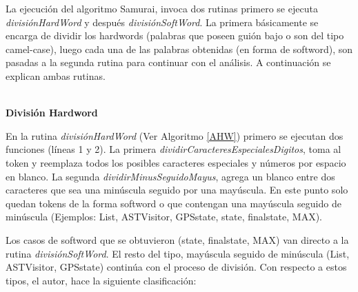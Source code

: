 


La ejecución del algoritmo Samurai, invoca dos rutinas primero se ejecuta \mbox{\textit{divisiónHardWord}} y después \mbox{\textit{divisiónSoftWord}}. La primera básicamente se encarga de dividir los hardwords (palabras que poseen guión bajo o son del tipo camel-case), luego cada una de las palabras obtenidas (en forma de softword), son pasadas a la segunda rutina para continuar con el análisis. A continuación se explican ambas rutinas.

\noindent \textbf{\\División Hardword\\}

En la rutina \textit{divisiónHardWord} (Ver Algoritmo \ref{AHW}) primero se ejecutan dos funciones (líneas 1 y 2). La primera \textit{dividirCaracteresEspecialesDigitos}, toma al token y reemplaza todos los posibles caracteres especiales y números por espacio en blanco. La segunda \mbox{\textit{dividirMinusSeguidoMayus}}, agrega un blanco entre dos caracteres que sea una minúscula seguido por una mayúscula. En este punto solo quedan tokens de la forma softword o que contengan una mayúscula seguido de minúscula (Ejemplos: \textsf{List, ASTVisitor, GPSstate, state, finalstate, MAX}).

Los casos de softword que se obtuvieron (\textsf{state}, \textsf{finalstate}, \textsf{MAX}) van directo a la rutina \mbox{\textit{divisiónSoftWord}}.
El resto del tipo, mayúscula seguido de minúscula (\textsf{List, ASTVisitor, GPSstate}) continúa con el proceso de división. Con respecto a estos tipos, el autor, hace la siguiente clasificación:

